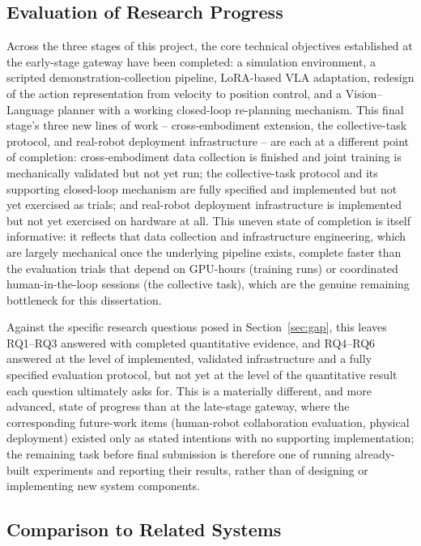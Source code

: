 \documentclass[12pt]{article}
\begin{document}
\subsection{Evaluation of Research Progress}

Across the three stages of this project, the core technical objectives established at the early-stage gateway have been completed: a simulation environment, a scripted demonstration-collection pipeline, LoRA-based VLA adaptation, redesign of the action representation from velocity to position control, and a Vision--Language planner with a working closed-loop re-planning mechanism. This final stage's three new lines of work -- cross-embodiment extension, the collective-task protocol, and real-robot deployment infrastructure -- are each at a different point of completion: cross-embodiment data collection is finished and joint training is mechanically validated but not yet run; the collective-task protocol and its supporting closed-loop mechanism are fully specified and implemented but not yet exercised as trials; and real-robot deployment infrastructure is implemented but not yet exercised on hardware at all. This uneven state of completion is itself informative: it reflects that data collection and infrastructure engineering, which are largely mechanical once the underlying pipeline exists, complete faster than the evaluation trials that depend on GPU-hours (training runs) or coordinated human-in-the-loop sessions (the collective task), which are the genuine remaining bottleneck for this dissertation.

Against the specific research questions posed in Section~\ref{sec:gap}, this leaves RQ1--RQ3 answered with completed quantitative evidence, and RQ4--RQ6 answered at the level of implemented, validated infrastructure and a fully specified evaluation protocol, but not yet at the level of the quantitative result each question ultimately asks for. This is a materially different, and more advanced, state of progress than at the late-stage gateway, where the corresponding future-work items (human-robot collaboration evaluation, physical deployment) existed only as stated intentions with no supporting implementation; the remaining task before final submission is therefore one of running already-built experiments and reporting their results, rather than of designing or implementing new system components.

\subsection{Comparison to Related Systems}
\end{document}
